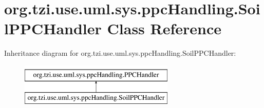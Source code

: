 \hypertarget{classorg_1_1tzi_1_1use_1_1uml_1_1sys_1_1ppc_handling_1_1_soil_p_p_c_handler}{\section{org.\-tzi.\-use.\-uml.\-sys.\-ppc\-Handling.\-Soil\-P\-P\-C\-Handler Class Reference}
\label{classorg_1_1tzi_1_1use_1_1uml_1_1sys_1_1ppc_handling_1_1_soil_p_p_c_handler}
}
Inheritance diagram for org.\-tzi.\-use.\-uml.\-sys.\-ppc\-Handling.\-Soil\-P\-P\-C\-Handler\-:\begin{figure}[H]
\begin{center}
\leavevmode
\includegraphics[height=2.000000cm]{classorg_1_1tzi_1_1use_1_1uml_1_1sys_1_1ppc_handling_1_1_soil_p_p_c_handler}
\end{center}
\end{figure}
